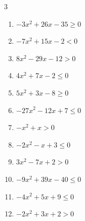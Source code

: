 \begin{multicols}{3}
\begin{enumerate}
  \item $-3x^{2}+26x-35\geq 0$


  \item $-7x^{2}+15x-2<0$


  \item $8x^{2}-29x-12>0$


  \item $4x^{2}+7x-2\leq 0$


  \item $5x^{2}+3x-8\geq 0$


  \item $-27x^{2}-12x+7\leq 0$


  \item $-x^{2}+x>0$

        \phantom{$\displaystyle 0 < x < 1$}

  \item $-2x^{2}-x+3\leq 0$


\columnbreak %

  \item $3x^{2}-7x+2>0$


  \item $-9x^{2}+39x-40\leq 0$


  \item $-4x^{2}+5x+9\leq 0$


  \item $-2x^{2}+3x+2>0$



\end{enumerate}
\end{multicols}
